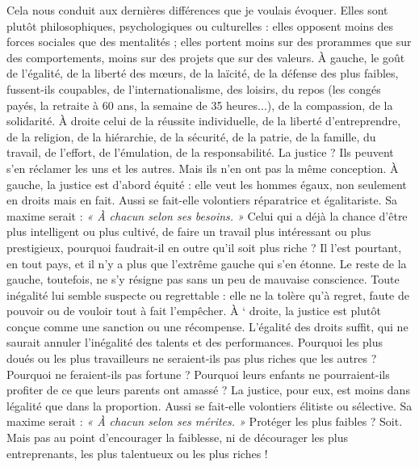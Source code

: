 Cela nous conduit aux dernières différences que je voulais évoquer. Elles
sont plutôt philosophiques, psychologiques ou culturelles : elles opposent
moins des forces sociales que des mentalités ; elles portent moins sur des prorammes
que sur des comportements, moins sur des projets que sur des valeurs.
À gauche, le goût de l'égalité, de la liberté des mœurs, de la laïcité, de la défense
des plus faibles, fussent-ils coupables, de l’internationalisme, des loisirs, du
repos (les congés payés, la retraite à 60 ans, la semaine de 35 heures...), de la
compassion, de la solidarité. À droite celui de la réussite individuelle, de la
liberté d’entreprendre, de la religion, de la hiérarchie, de la sécurité, de la
patrie, de la famille, du travail, de l'effort, de l’émulation, de la responsabilité.
La justice ? Ils peuvent s’en réclamer les uns et les autres. Mais ils n’en ont pas
la même conception. À gauche, la justice est d’abord équité : elle veut les
hommes égaux, non seulement en droits mais en fait. Aussi se fait-elle volontiers
réparatrice et égalitariste. Sa maxime serait : {\it « À chacun selon ses besoins. »}
Celui qui a déjà la chance d’être plus intelligent ou plus cultivé, de faire un travail
plus intéressant ou plus prestigieux, pourquoi faudrait-il en outre qu’il soit
plus riche ? Il l’est pourtant, en tout pays, et il n’y a plus que l’extrême gauche
qui s’en étonne. Le reste de la gauche, toutefois, ne s’y résigne pas sans un peu
de mauvaise conscience. Toute inégalité lui semble suspecte ou regrettable : elle
ne la tolère qu’à regret, faute de pouvoir ou de vouloir tout à fait l'empêcher. À
‘ droite, la justice est plutôt conçue comme une sanction ou une récompense.
L'égalité des droits suffit, qui ne saurait annuler l’inégalité des talents et des
performances. Pourquoi les plus doués ou les plus travailleurs ne seraient-ils pas
plus riches que les autres ? Pourquoi ne feraient-ils pas fortune ? Pourquoi leurs
enfants ne pourraient-ils profiter de ce que leurs parents ont amassé ? La justice,
pour eux, est moins dans légalité que dans la proportion. Aussi se fait-elle
volontiers élitiste ou sélective. Sa maxime serait : {\it « À chacun selon ses mérites. »}
Protéger les plus faibles ? Soit. Mais pas au point d’encourager la faiblesse, ni
de décourager les plus entreprenants, les plus talentueux ou les plus riches !

